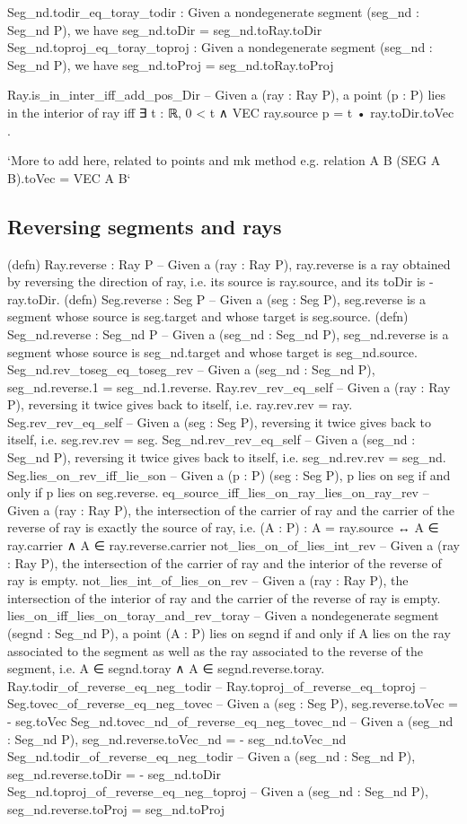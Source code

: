 \documentclass[12pt,a4paper]{article}
\begin{document}
    Seg_nd.todir_eq_toray_todir : Given a nondegenerate segment (seg_nd : Seg_nd P), we have seg_nd.toDir = seg_nd.toRay.toDir
    Seg_nd.toproj_eq_toray_toproj : Given a nondegenerate segment (seg_nd : Seg_nd P), we have seg_nd.toProj = seg_nd.toRay.toProj

    Ray.is_in_inter_iff_add_pos_Dir -- Given a (ray : Ray P), a point (p : P) lies in the interior of ray iff  ∃ t : ℝ, 0 < t ∧ VEC ray.source p = t • ray.toDir.toVec .

    `More to add here, related to points and mk method e.g. relation A B (SEG A B).toVec = VEC A B`

\subsection{Reversing segments and rays}

    (defn) Ray.reverse : Ray P -- Given a (ray : Ray P), ray.reverse is a ray obtained by reversing the direction of ray, i.e. its source is ray.source, and its toDir is - ray.toDir.
    (defn) Seg.reverse : Seg P -- Given a (seg : Seg P), seg.reverse is a segment whose source is seg.target and whose target is seg.source.
    (defn) Seg_nd.reverse : Seg_nd P -- Given a (seg_nd : Seg_nd P), seg_nd.reverse is a segment whose source is seg_nd.target and whose target is seg_nd.source.
    Seg_nd.rev_toseg_eq_toseg_rev -- Given a (seg_nd : Seg_nd P), seg_nd.reverse.1 = seg_nd.1.reverse.
    Ray.rev_rev_eq_self -- Given a (ray : Ray P), reversing it twice gives back to itself, i.e. ray.rev.rev = ray.
    Seg.rev_rev_eq_self -- Given a (seg : Seg P), reversing it twice gives back to itself, i.e. seg.rev.rev = seg.
    Seg_nd.rev_rev_eq_self -- Given a (seg_nd : Seg_nd P), reversing it twice gives back to itself, i.e. seg_nd.rev.rev = seg_nd.
    Seg.lies_on_rev_iff_lie_son -- Given a (p : P) (seg : Seg P), p lies on seg if and only if p lies on seg.reverse.
    eq_source_iff_lies_on_ray_lies_on_ray_rev -- Given a (ray : Ray P), the intersection of the carrier of ray and the carrier of the reverse of ray is exactly the source of ray, i.e. (A : P) : A = ray.source ↔ A ∈ ray.carrier ∧ A ∈ ray.reverse.carrier
    not_lies_on_of_lies_int_rev -- Given a (ray : Ray P), the intersection of the carrier of ray and the interior of the reverse of ray is empty.
    not_lies_int_of_lies_on_rev -- Given a (ray : Ray P), the intersection of the interior of ray and the carrier of the reverse of ray is empty.
    lies_on_iff_lies_on_toray_and_rev_toray -- Given a nondegenerate segment (segnd : Seg_nd P), a point (A : P) lies on segnd if and only if A lies on the ray associated to the segment as well as the ray associated to the reverse of the segment, i.e. A ∈ segnd.toray ∧ A ∈ segnd.reverse.toray.
    Ray.todir_of_reverse_eq_neg_todir --
    Ray.toproj_of_reverse_eq_toproj --
    Seg.tovec_of_reverse_eq_neg_tovec -- Given a (seg : Seg P), seg.reverse.toVec = - seg.toVec
    Seg_nd.tovec_nd_of_reverse_eq_neg_tovec_nd -- Given a (seg_nd : Seg_nd P), seg_nd.reverse.toVec_nd = - seg_nd.toVec_nd
    Seg_nd.todir_of_reverse_eq_neg_todir -- Given a (seg_nd : Seg_nd P), seg_nd.reverse.toDir = - seg_nd.toDir
    Seg_nd.toproj_of_reverse_eq_neg_toproj -- Given a (seg_nd : Seg_nd P), seg_nd.reverse.toProj = seg_nd.toProj
\end{document}
